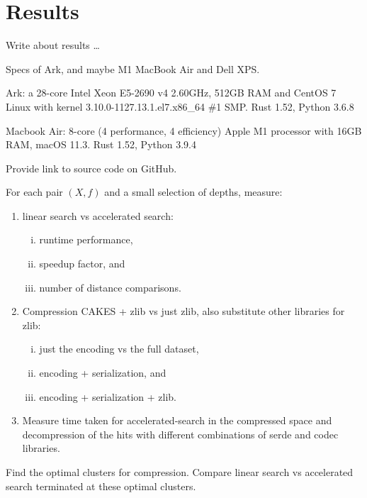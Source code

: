 \section{Results}
\label{sec:results}

Write about results \dots

Specs of Ark, and maybe M1 MacBook Air and Dell XPS.

Ark: a 28-core Intel Xeon E5-2690 v4 2.60GHz, 512GB RAM and CentOS 7 Linux with kernel 3.10.0-1127.13.1.el7.x86\_64 \#1 SMP. Rust 1.52, Python 3.6.8

Macbook Air: 8-core (4 performance, 4 efficiency) Apple M1 processor with 16GB RAM, macOS 11.3. Rust 1.52, Python 3.9.4

Provide link to source code on GitHub.

For each pair $(X, f)$ and a small selection of depths, measure:
\begin{enumerate}[1.]
    \item linear search vs accelerated search:
    \begin{enumerate}[i.]
        \item runtime performance,
        \item speedup factor, and
        \item number of distance comparisons.
    \end{enumerate}
    \item Compression CAKES + zlib vs just zlib, also substitute other libraries for zlib:
    \begin{enumerate}[i.]
        \item just the encoding vs the full dataset,
        \item encoding + serialization, and
        \item encoding + serialization + zlib.
    \end{enumerate}
    \item Measure time taken for accelerated-search in the compressed space and decompression of the hits with different combinations of serde and codec libraries.
\end{enumerate}

Find the optimal clusters for compression.
Compare linear search vs accelerated search terminated at these optimal clusters.
